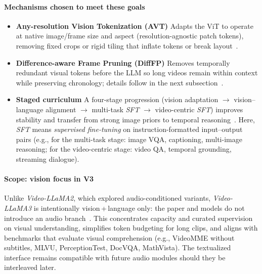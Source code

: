 \begin{enrichment}
\begin{enrichment}
        \paragraph{Mechanisms chosen to meet these goals}
        \begin{itemize}
            \item \textbf{Any\mbox{-}resolution Vision Tokenization (AVT)} Adapts the ViT to operate at native image/frame size and aspect (resolution\mbox{-}agnostic patch tokens), removing fixed crops or rigid tiling that inflate tokens or break layout~\cite[Sec.~3.1]{zhang2025_videollama3}.
            \item \textbf{Difference\mbox{-}aware Frame Pruning (DiffFP)} Removes temporally redundant visual tokens before the LLM so long videos remain within context while preserving chronology; details follow in the next subsection~\cite[Sec.~2.2]{zhang2025_videollama3}.
            \item \textbf{Staged curriculum} A four\mbox{-}stage progression (vision adaptation $\rightarrow$ vision–language alignment $\rightarrow$ multi\mbox{-}task \emph{SFT} $\rightarrow$ video\mbox{-}centric \emph{SFT}) improves stability and transfer from strong image priors to temporal reasoning~\cite[Sec.~3]{zhang2025_videollama3}. Here, \emph{SFT} means \emph{supervised fine\mbox{-}tuning} on instruction\mbox{-}formatted input–output pairs (e.g., for the multi\mbox{-}task stage: image VQA, captioning, multi\mbox{-}image reasoning; for the video\mbox{-}centric stage: video QA, temporal grounding, streaming dialogue).
        \end{itemize}
        
        \paragraph{Scope: vision focus in V3}
        Unlike \emph{Video\mbox{-}LLaMA2}, which explored audio\mbox{-}conditioned variants, \emph{Video\mbox{-}LLaMA3} is intentionally vision\,+\,language only: the paper and models do not introduce an audio branch~\cite{zhang2025_videollama3}. This concentrates capacity and curated supervision on visual understanding, simplifies token budgeting for long clips, and aligns with benchmarks that evaluate visual comprehension (e.g., VideoMME without subtitles, MLVU, PerceptionTest, DocVQA, MathVista). The textualized interface remains compatible with future audio modules should they be interleaved later.
        

\end{enrichment}
\end{enrichment}
